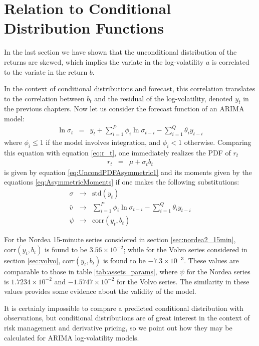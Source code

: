 \section{Relation to Conditional Distribution Functions}
In the last section we have shown that the unconditional distribution of
the returns are skewed, which implies the variate in the
log-volatility $a$ is correlated to the variate in the return
$b$.

In the context of conditional distributions and forecast, this
correlation translates to the correlation between $b_t$ and the
residual of the log-volatility, denoted $y_t$ in the previous
chapters. Now let us consider the forecast function of an ARIMA model:
\begin{eqnarray*}
  \ln \sigma_t &=& y_t + \sum_{i=1}^P \phi_i \ln \sigma_{t-i} -
  \sum_{i=1}^Q \theta_i y_{t-i}
\end{eqnarray*}
where $\phi_i \leq 1$ if the model involves integration, and $\phi_i <
1$ otherwise. Comparing this equation with equation \ref{eq:r_t}, one
immediately realizes the PDF of $r_t$
\begin{eqnarray*}
  r_t &=& \mu + \sigma_t b_t
\end{eqnarray*}
is given by equation \ref{eq:UncondPDFAsymmetric1} and its moments
given by the equations \ref{eq:AsymmetricMoments} if one makes the
following substitutions:
\begin{eqnarray*}
  \sigma &\to& \text{std}(y_t) \\
  \bar{v} &\to& \sum_{i=1}^P \phi_i \ln \sigma_{t-i} - \sum_{i=1}^Q
  \theta_i y_{t-i} \\
  \psi &\to& \text{corr}(y_t, b_t)
\end{eqnarray*}

For the Nordea 15-minute series considered in section \ref{sec:nordea2_15min},
$\text{corr}(y_t, b_t)$ is found to be $3.56 \times 10^{-2}$; while
for the Volvo series considered in section \ref{sec:volvo},
$\text{corr}(y_t, b_t)$ is found to be $-7.3 \times 10^{-3}$. These
values are comparable to those in table \ref{tab:assets_params}, where
$\psi$ for the Nordea series is $1.7234 \times 10^{-2}$ and $-1.5747
\times 10^{-2}$ for the Volvo series. The similarity in these values
provides some evidence about the validity of the model.

It is certainly impossible to compare a predicted conditional
distribution with observations, but conditional distributions are of
great interest in the context of risk management and derivative
pricing, so we point out how they may be calculated for ARIMA
log-volatility models.
